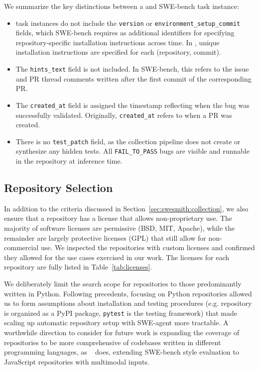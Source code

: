 We summarize the key distinctions between a \bugs{} and SWE-bench task instance:
\begin{itemize}
    \item \bugs{} task instances do not include the \texttt{version} or \texttt{environment\_setup\_commit} fields, which SWE-bench requires as additional identifiers for specifying repository-specific installation instructions across time.
    In \bugs{}, unique installation instructions are specified for each (repository, commit).
    \item The \texttt{hints\_text} field is not included. In SWE-bench, this refers to the issue and PR thread comments written after the first commit of the corresponding PR.
    \item The \texttt{created\_at} field is assigned the timestamp reflecting when the bug was successfully validated.
    Originally, \texttt{created\_at} refers to when a PR was created.
    \item There is no \texttt{test\_patch} field, as the \bugs{} collection pipeline does not create or synthesize any hidden tests.
    All \texttt{FAIL\_TO\_PASS} bugs are visible and runnable in the repository at inference time.
\end{itemize}

\subsection{Repository Selection}
\label{appx:infra:repo_selection}
In addition to the criteria discussed in Section~\ref{sec:swesmith:collection}, we also ensure that a repository has a license that allows non-proprietary use.
The majority of software licenses are permissive (BSD, MIT, Apache), while the remainder are largely protective licenses (GPL) that still allow for non-commercial use.
We inspected the repositories with custom licenses and confirmed they allowed for the use cases exercised in our work.
The licenses for each repository are fully listed in Table~\ref{tab:licenses}.



We deliberately limit the search scope for repositories to those predominantly written in Python.
Following precedents, focusing on Python repositories allowed us to form assumptions about installation and testing procedures (e.g. repository is organized as a PyPI package, \texttt{pytest} is the testing framework) that made scaling up automatic repository setup with SWE-agent more tractable.
A worthwhile direction to consider for future work is expanding the coverage of repositories to be more comprehensive of codebases written in different programming languages, as ~\citet{yang_swe-bench_2024} does, extending SWE-bench style evaluation to JavaScript repositories with multimodal inputs.

